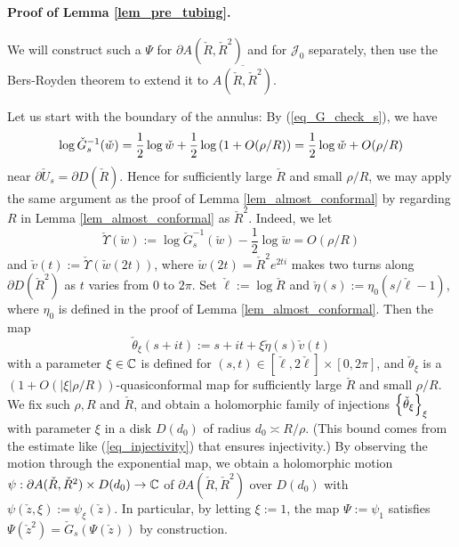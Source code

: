 \paragraph{\bf Proof of Lemma \ref{lem_pre_tubing}.}
We will construct such a $\Psi$ for $\partial A(\check{R}, \check{R}^2)$
and for $\mathcal{J}_0$ separately, 
then use the Bers-Royden theorem 
to extend it to $\overline{A(\check{R}, \check{R}^2)}$. 

Let us start with the boundary of the annulus:
By (\ref{eq_G_check_s}), we have 
$$
\log \check{G}_s^{-1}(\check{w})
= \frac{1}{2}\log \check{w}+ \frac{1}{2}\log{\left( 1+O(\rho/R) \right)}
= \frac{1}{2}\log \check{w}+ O(\rho/R)
$$
near $\partial \check{U}_s=\partial D(\check{R})$.
Hence for sufficiently large $\check{R}$ and small $\rho/R$,
we may apply the same argument as the proof of 
Lemma \ref{lem_almost_conformal}
by regarding $R$ in Lemma \ref{lem_almost_conformal} as $\check{R}^2$.
Indeed, we let 
$$
\check{\Upsilon}(\check{w}):=  
\log \check{G}_s^{-1}(\check{w})-\frac{1}{2}\log \check{w}
=O(\rho/R)
$$
and $\check{v}(t):=\check{\Upsilon}(\check{w}(2t))$,
where $\check{w}(2t)=\check{R}^2e^{2t i}$
makes two turns along $\partial D(\check{R}^2)$ as $t$ varies from $0$ to $2\pi$.
Set $\check{\ell}:=\log \check{R}$ and $\check{\eta}(s):=\eta_0(s/\check{\ell}-1)$,
where $\eta_0$ is defined in the proof of Lemma \ref{lem_almost_conformal}.
Then the map
$$
\check{\theta}_\xi(s+it):=s+it + \xi \check{\eta}(s)\check{v}(t)
$$
with a parameter $\xi \in \mathbb C$ 
is defined for $(s,t) \in [\check{\ell}, 2 \check{\ell}] \times [0,2\pi]$,
and $\check{\theta}_\xi$ is a $(1+O(|\xi|\rho/R))$-quasiconformal map
for sufficiently large $\check{R}$ and small $\rho/R$.
We fix such $\rho, R$ and $\check{R}$,
and obtain a holomorphic family of injections
${\left\{ \check{\theta}_\xi \right\}}_{\xi}$
with parameter $\xi$ in a disk $D(d_0)$  of radius $d_0 \asymp R/\rho$.
(This bound comes from the estimate like (\ref{eq_injectivity})
that ensures injectivity.)
By observing the motion through the exponential map,
we obtain a holomorphic motion 
$\psi: \partial A(\check{R},\check{R}^2) \times D(d_0) \to \mathbb C$
of $\partial A(\check{R},\check{R}^2)$ over $D(d_0)$
with $\psi(\check{z},\xi):=\psi_\xi(\check{z})$.
In particular, by letting $\xi:=1$, 
the map $\Psi:= \psi_1$  
satisfies 
 $\Psi(\check{z}^2)=\check{G}_s(\Psi(\check{z}))$
 by construction.


